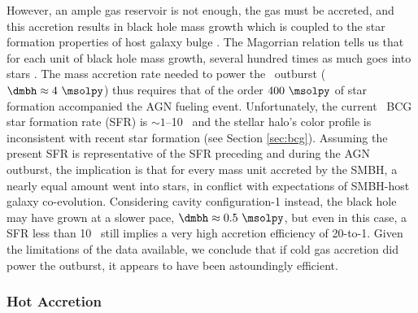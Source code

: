 \documentclass[iop]{emulateapj}
\begin{document}
However, an ample gas reservoir is not enough, the gas must be
accreted, and this accretion results in black hole mass growth which
is coupled to the star formation properties of host galaxy bulge
\citep[\eg][]{1995ARA&A..33..581K, 2000ApJ...539L...9F}. The Magorrian
relation \citep{magorrian} tells us that for each unit of black hole
mass growth, several hundred times as much goes into stars
\citep[\eg][]{2004ApJ...604L..89H}. The mass accretion rate needed to
power the \rbs\ outburst ($\dmbh \approx 4 ~\msolpy$) thus requires
that of the order $400 ~\msolpy$ of star formation accompanied the AGN
fueling event. Unfortunately, the current \rbs\ BCG star formation
rate (SFR) is $\sim 1$--10 \msolpy\ and the stellar halo's color
profile is inconsistent with recent star formation (see Section
\ref{sec:bcg}). Assuming the present SFR is representative of the SFR
preceding and during the AGN outburst, the implication is that for
every mass unit accreted by the SMBH, a nearly equal amount went into
stars, in conflict with expectations of SMBH-host galaxy
co-evolution. Considering cavity configuration-1 instead, the black
hole may have grown at a slower pace, $\dmbh \approx 0.5 ~\msolpy$,
but even in this case, a SFR less than 10 \msolpy\ still implies a
very high accretion efficiency of 20-to-1. Given the limitations of
the data available, we conclude that if cold gas accretion did power
the outburst, it appears to have been astoundingly efficient.

\subsubsection{Hot Accretion}
\end{document}
